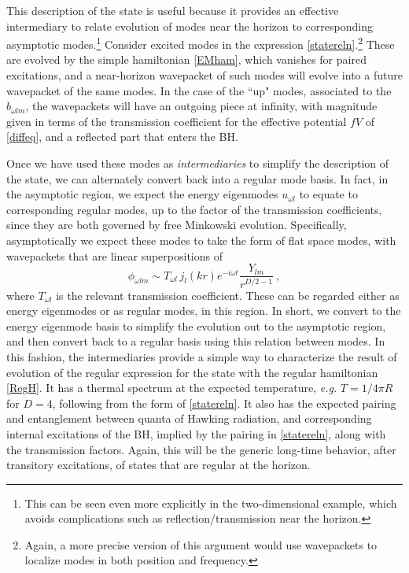 \documentclass[11pt]{article}
\numberwithin{equation}{section}
\newcommand{\beq}{\begin{equation}}
\newcommand{\eeq}{\end{equation}}
\begin{document}
This description of the state is useful because it provides an effective intermediary to relate evolution of modes near the horizon to corresponding asymptotic modes.\footnote{This can be seen even more explicitly in the two-dimensional example\cite{SE2d}, which avoids complications such as reflection/transmission near the horizon.}  Consider  excited modes in the expression \eqref{statereln}.\footnote{Again, a more precise version of this argument would use wavepackets to localize modes in both position and frequency.}  These are evolved by the simple hamiltonian \eqref{EMham}, which vanishes for paired excitations, and a near-horizon wavepacket of such modes will evolve into a future wavepacket of the same modes.  In the case of the ``up" modes, associated to the $b_{\omega l m}$, the wavepackets will have an outgoing piece at infinity, with magnitude given in terms of the transmission coefficient for the effective potential $fV$ of \eqref{diffeq}, and a reflected part that enters the BH.

Once we have used these modes as {\it intermediaries} to simplify the description of the state, we can alternately convert back into a regular mode basis.  In fact, in the asymptotic region, we expect the energy eigenmodes $u_{\omega l}$ to equate to corresponding regular modes, up to the factor of the transmission coefficients, since they are both governed by free Minkowski evolution.   Specifically, asymptotically we expect these modes to take the form of flat space modes, with wavepackets that are linear superpositions of
\beq
\phi_{\omega l m} \sim T_{\omega l}\, j_l(kr) e^{-i\omega t}\frac{Y_{lm}}{r^{D/2-1}}\ ,
\eeq
where $T_{\omega l}$ is the relevant transmission coefficient.  These can be regarded either as energy eigenmodes or as regular modes, in this region.
 In short, we convert to the energy eigenmode basis to simplify the evolution out to the asymptotic region, and then convert back to a regular basis using this relation between modes.
In this fashion, the intermediaries provide a simple way to characterize the result of evolution of the regular expression for the state with the regular hamiltonian \eqref{RegH}.   It has a thermal spectrum at the expected temperature, {\it e.g.}  $T=1/4\pi R$ for $D=4$, following from the form of \eqref{statereln}.  It also has the expected pairing and entanglement between  quanta of Hawking radiation, and corresponding internal excitations of the BH, implied by the pairing in  \eqref{statereln}, along with the transmission factors.  Again, this will be the generic long-time behavior, after transitory excitations, of states that are regular at the horizon.
\end{document}
